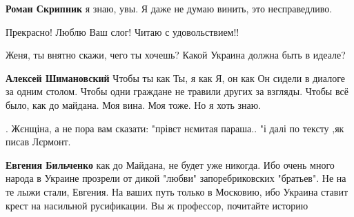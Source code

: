 \begin{itemize}
\begin{itemize}
\textbf{Роман Скрипник} я знаю, увы. Я даже не думаю винить, это несправедливо.
\end{itemize}

 
Прекрасно! Люблю Ваш слог! Читаю с удовольствием!!


Женя, ты внятно скажи, чего ты хочешь? Какой Украина должна быть в идеале?

\begin{itemize}
 
\textbf{Алексей Шимановский} Чтобы ты как Ты, я как Я, он как Он сидели в
диалоге за одним столом. Чтобы одни граждане не травили других за взгляды.
Чтобы всё было, как до майдана. Моя вина. Моя тоже. Но я хоть знаю.

 
.
Жєнщіна, а не пора вам сказати: "прівєт нємитая параша.. "і далі по тексту ,як писав Лєрмонт.

 
\textbf{Евгения Бильченко} как до Майдана, не будет уже никогда. Ибо очень
много народа в Украине прозрели от дикой "любви" запоребриковских "братьев". Не
на те лыжи стали, Евгения. На ваших путь только в Московию, ибо Украина ставит
крест на насильной русификации. Вы ж профессор, почитайте историю

 

\end{itemize}
\end{itemize}
